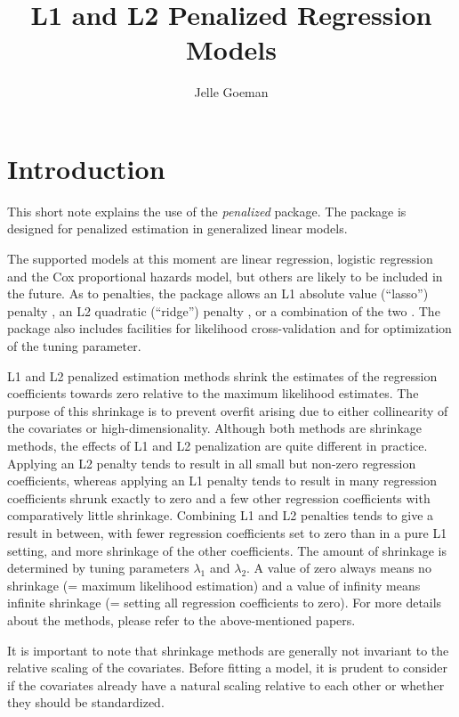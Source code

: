 \documentclass[a4paper]{article}
\title{L1 and L2 Penalized Regression Models}
\author{Jelle Goeman}
\newcommand{\Rpackage}[1]{{\textit{#1}}}
\begin{document}
\maketitle \tableofcontents \newpage

\section{Introduction}

This short note explains the use of the \Rpackage{penalized} package. The package is designed for penalized estimation in generalized linear models.

The supported models at this moment are linear regression, logistic regression and the Cox proportional hazards model, but others are likely to be included in the future. As to penalties, the package allows an L1 absolute value (``lasso'') penalty \citep{Tibshirani1996, Tibshirani1997}, an L2 quadratic (``ridge'') penalty \citep{Hoerl1970, Cessie1992, Verweij1994}, or a combination of the two \citep[the ``naive elastic net'' of][]{Zou2005}. The package also includes facilities for likelihood cross-validation and for optimization of the tuning parameter.

L1 and L2 penalized estimation methods shrink the estimates of the regression coefficients towards zero relative to the maximum likelihood estimates. The purpose of this shrinkage is to prevent overfit arising due to either collinearity of the covariates or high-dimensionality. Although both methods are shrinkage methods, the effects of L1 and L2 penalization are quite different in practice. Applying an L2 penalty tends to result in all small but non-zero regression coefficients, whereas applying an L1 penalty tends to result in many regression coefficients shrunk exactly to zero and a few other regression coefficients with comparatively little shrinkage. Combining L1 and L2 penalties tends to give a result in between, with fewer regression coefficients set to zero than in a pure L1 setting, and more shrinkage of the other coefficients. The amount of shrinkage is determined by tuning parameters $\lambda_1$ and $\lambda_2$. A value of zero always means no shrinkage (= maximum likelihood estimation) and a value of infinity means infinite shrinkage (= setting all regression coefficients to zero). For more details about the methods, please refer to the above-mentioned papers.

It is important to note that shrinkage methods are generally not invariant to the relative scaling of the covariates. Before fitting a model, it is prudent to consider if the covariates already have a natural scaling relative to each other or whether they should be standardized.
\end{document}
